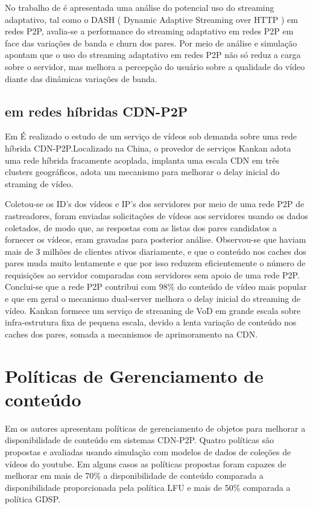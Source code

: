 \documentclass[
	12pt,
	oneside,
	a4paper,
	english,
	brazil
	]{abntex2ppgsi}
\begin{document}
No trabalho de \cite{Xu2013}é apresentada uma análise do potencial uso do streaming adaptativo, tal como o DASH ( Dynamic Adaptive Streaming over HTTP ) em redes P2P, avalia-se a performance do streaming adaptativo em redes P2P em face das variações de banda e churn dos pares. Por meio de análise e simulação apontam que o uso do streaming adaptativo em redes P2P não só reduz a carga sobre o servidor, mas melhora a percepção do usuário sobre a qualidade do vídeo diante das dinâmicas variações de banda.

\subsection{ em redes híbridas CDN-P2P}
Em \cite{Zhang2015} É realizado o estudo de um serviço de vídeos sob demanda sobre uma rede híbrida CDN-P2P.Localizado na China, o provedor de serviços Kankan adota uma rede híbrida fracamente acoplada, implanta uma escala CDN em três clusters geográficos, adota um mecanismo para melhorar o delay inicial do straming de vídeo.

Coletou-se os ID's dos vídeos e IP's dos servidores por meio de uma rede P2P de rastreadores, foram enviadas solicitações de vídeos aos servidores usando os dados coletados, de modo que, as respostas com as listas dos pares candidatos a fornecer os vídeos, eram gravadas para posterior análise. Observou-se que haviam mais de 3 milhões de clientes ativos diariamente, e que o conteúdo nos caches dos pares muda muito lentamente e que por isso reduzem eficientemente o número de requisições ao servidor comparadas com servidores sem apoio de uma rede P2P.
Conclui-se que a rede P2P contribui com 98\% do conteúdo de vídeo mais popular e que em geral o mecanismo dual-server melhora o delay inicial do streaming de vídeo. Kankan formece um serviço de streaming de VoD em grande escala sobre infra-estrutura fixa de pequena escala, devido a lenta variação de conteúdo nos caches dos pares, somada a mecanismos de aprimoramento na CDN.





\section{Políticas de Gerenciamento de conteúdo}

Em \cite{Oliveira} os autores apresentam políticas de gerenciamento de objetos para melhorar a disponibilidade de conteúdo em sistemas CDN-P2P. Quatro políticas são propostas e avaliadas usando simulação com modelos de dados de coleções de vídeos do youtube. Em alguns casos as políticas propostas foram capazes de melhorar em mais de 70\% a disponibilidade de conteúdo comparada a disponibilidade proporcionada pela política LFU e mais de 50\% comparada a política GDSP.
\end{document}
